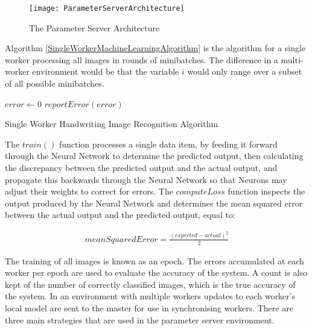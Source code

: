 \documentclass[12pt]{article}
\begin{document}
\begin{figure}[H]
  \centering
  \texttt{[image: ParameterServerArchitecture]}
  \caption[]{The Parameter Server Architecture}
  \label{ParameterServerArchitecture}
\end{figure}

Algorithm \ref{SingleWorkerMachineLearningAlgorithm} is the algorithm for a single worker processing all images in rounds of minibatches. The difference in a multi-worker environment would be that the variable $i$ would only range over a subset of all possible minibatches.

\IncMargin{1em}
\begin{algorithm}[H]
 \BlankLine

$error \longleftarrow 0$\;
  $reportError(error)$\;
 \caption{Single Worker Handwriting Image Recognition Algorithm}
 \label{SingleWorkerMachineLearningAlgorithm}
\end{algorithm}
\DecMargin{1em}
\medskip

The $train()$ function processes a single data item, by feeding it forward through the Neural Network to determine the predicted output, then calculating the discrepancy between the predicted output and the actual output, and propagate this backwards through the Neural Network so that Neurons may adjust their weights to correct for errors. The $computeLoss$ function inspects the output produced by the Neural Network and determines the mean squared error between the actual output and the predicted output, equal to:

\begin{align*}
meanSquaredError = \frac{(expected - actual)^2}{2}
\end{align*}

The training of all images is known as an epoch. The errors accumulated at each worker per epoch are used to evaluate the accuracy of the system. A count is also kept of the number of correctly classified images, which is the true accuracy of the system.
\newline
\newline
In an environment with multiple workers updates to each worker's local model are sent to the master for use in synchronising workers. There are three main strategies that are used in the parameter server environment.
\end{document}
